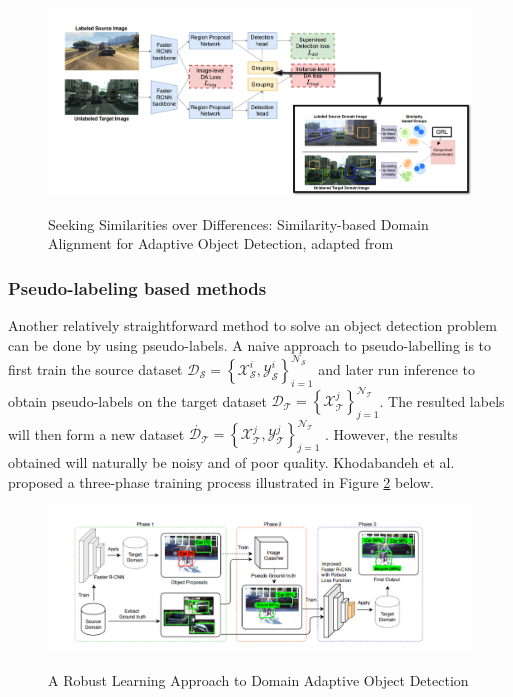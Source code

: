 \documentclass[english, 12pt, a4paper, elec, utf8, a-1b, online]{aaltothesis}
\begin{document}
\begin{figure}[htb]
	\begin{center}
		\includegraphics[width=16cm]{./VisGa.png}
	\end{center}
	\caption{Seeking Similarities over Differences: Similarity-based Domain Alignment for Adaptive Object Detection, adapted from \cite{Rezaeianaran2021}}
	\begin{center}
		\label{visga}
	\end{center}
\end{figure}
\FloatBarrier


\subsubsection{Pseudo-labeling based methods}

Another relatively straightforward method to solve an object detection problem can be done by using pseudo-labels. A naive approach to pseudo-labelling is to first train the source dataset $\mathcal{D}_{\mathcal{S}}=\left\{\mathcal{X}_{\mathcal{S}}^{i}, \mathcal{Y}_{\mathcal{S}}^{i}\right\}_{i=1}^{\mathcal{N}_{\mathcal{S}}}$ and later run inference to obtain pseudo-labels on the target dataset $\mathcal{D}_{\mathcal{T}}=\left\{\mathcal{X}_{\mathcal{T}}^{j}\right\}_{j=1}^{\mathcal{N}_{\mathcal{T}}}$. The resulted labels will then form a new dataset $\dot{\mathcal{D}_{\mathcal{T}}}=\left\{\mathcal{X}_{\mathcal{T}}^{j}, \mathcal{Y}_{\mathcal{T}}^{j}\right\}_{j=1}^{\mathcal{N}_{\mathcal{T}}}$ \cite{Oza2021}. However, the results obtained will naturally be noisy and of poor quality. Khodabandeh et al. proposed a three-phase training process illustrated in Figure \ref{robust} below. 

\begin{figure}[htb]
	\begin{center}
		\includegraphics[width=16cm]{./robust.png}
	\end{center}
	\caption{A Robust Learning Approach to Domain Adaptive Object Detection\cite{Khodabandeh2019}}
	\begin{center}
		\label{robust}
	\end{center}
\end{figure}
\FloatBarrier
\end{document}
